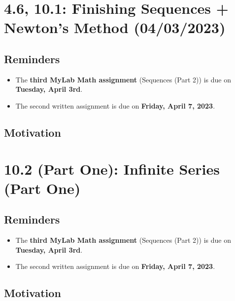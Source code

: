 \documentclass{report}
\newtheorem{thm}{Theorem}
\begin{document}
\begin{sloppypar}
\begin{center}
{{    }
  }
\end{center}
\begin{center}
\end{center}

\begin{center}
\end{center}




\chapter{4.6, 10.1: Finishing Sequences +  Newton's Method (04/03/2023)}
\section{Reminders}
\begin{itemize}
  \item The \textbf{third MyLab Math assignment} (Sequences
        (Part 2)) is due on \textbf{Tuesday, April 3rd}.
  \item The second written assignment is due on \textbf{
        Friday, April 7, 2023}.
\end{itemize}
\section{Motivation}
\chapter{10.2 (Part One): Infinite Series (Part One)}
\section{Reminders}
\begin{itemize}
  \item The \textbf{third MyLab Math assignment} (Sequences
        (Part 2)) is due on \textbf{Tuesday, April 3rd}.
  \item The second written assignment is due on \textbf{
        Friday, April 7, 2023}.
\end{itemize}

\section{Motivation}

\end{sloppypar}
\end{document}
